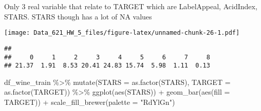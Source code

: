 \documentclass[
]{article}
\newenvironment{Shaded}{\begin{snugshade}}{\end{snugshade}}
\newcommand{\AttributeTok}[1]{\textcolor[rgb]{0.77,0.63,0.00}{#1}}
\newcommand{\CommentTok}[1]{\textcolor[rgb]{0.56,0.35,0.01}{\textit{#1}}}
\newcommand{\DecValTok}[1]{\textcolor[rgb]{0.00,0.00,0.81}{#1}}
\newcommand{\FunctionTok}[1]{\textcolor[rgb]{0.00,0.00,0.00}{#1}}
\newcommand{\NormalTok}[1]{#1}
\newcommand{\OtherTok}[1]{\textcolor[rgb]{0.56,0.35,0.01}{#1}}
\newcommand{\SpecialCharTok}[1]{\textcolor[rgb]{0.00,0.00,0.00}{#1}}
\newcommand{\StringTok}[1]{\textcolor[rgb]{0.31,0.60,0.02}{#1}}
\begin{document}
Only 3 real variable that relate to TARGET which are LabelAppeal,
AcidIndex, STARS. STARS though has a lot of NA values

\begin{Shaded}
\end{Shaded}

\texttt{[image: Data\_621\_HW\_5\_files/figure-latex/unnamed-chunk-26-1.pdf]}

\begin{Shaded}
\end{Shaded}

\begin{verbatim}
## 
##     0     1     2     3     4     5     6     7     8 
## 21.37  1.91  8.53 20.41 24.83 15.74  5.98  1.11  0.13
\end{verbatim}

\begin{Shaded}
\begin{Highlighting}[]
\NormalTok{df\_wine\_train }\SpecialCharTok{\%\textgreater{}\%} 
  \FunctionTok{mutate}\NormalTok{(}\AttributeTok{STARS =} \FunctionTok{as.factor}\NormalTok{(STARS),}
         \AttributeTok{TARGET =} \FunctionTok{as.factor}\NormalTok{(TARGET)) }\SpecialCharTok{\%\textgreater{}\%} 
  \FunctionTok{ggplot}\NormalTok{(}\FunctionTok{aes}\NormalTok{(STARS)) }\SpecialCharTok{+}
  \FunctionTok{geom\_bar}\NormalTok{(}\FunctionTok{aes}\NormalTok{(}\AttributeTok{fill =}\NormalTok{ TARGET)) }\SpecialCharTok{+}
  \FunctionTok{scale\_fill\_brewer}\NormalTok{(}\AttributeTok{palette =} \StringTok{"RdYlGn"}\NormalTok{) }
\end{Highlighting}
\end{Shaded}
\end{document}

